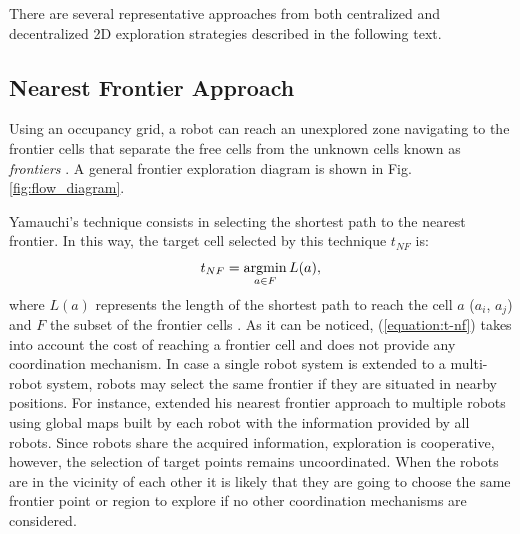 There are several representative approaches from both centralized and decentralized 2D exploration strategies described in the following text. 

\subsection{Nearest Frontier Approach} 
Using an occupancy grid, a robot can reach an unexplored zone navigating to the frontier cells that separate the free cells from the unknown cells known as \textit{frontiers} \cite{Yamauchi1997}. A general frontier exploration diagram is shown in Fig. \ref{fig:flow_diagram}.

Yamauchi's technique consists in selecting the shortest path to the nearest frontier. In this way, the target cell selected by this technique $t_{NF}$ is:
\begin{equation}
t_{NF} = \operatorname*{argmin}_{a \in F} L(a), 
\label{equation:t-nf}
\end{equation}
where $L(a)$ represents the length of the shortest path to reach the cell $a$ ($a_{i}$, $a_{j}$) and $F$ the subset of the frontier cells \cite{Julia2012}. As it can be noticed, (\ref{equation:t-nf}) takes into account the cost of reaching a frontier cell and does not provide any coordination mechanism. In case a single robot system is extended to a multi-robot system, robots may select the same frontier if they are situated in nearby positions. For instance, \cite{Yamauchi1998} extended his nearest frontier approach to multiple robots using global maps built by each robot with the information provided by all robots. Since robots share the acquired information, exploration is cooperative, however, the selection of target points remains uncoordinated. When the robots are in the vicinity of each other it is likely that they are going to choose the same frontier point or region to explore if no other coordination mechanisms are considered.

